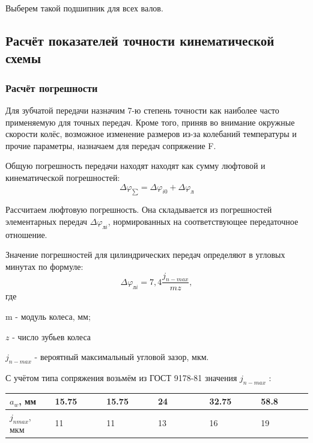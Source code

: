 \documentclass[14pt,a4paper,russian]{scrartcl}
\begin{document}
        Выберем такой подшипник для всех валов.

    
\subsection{Расчёт показателей точности кинематической схемы}
    \subsubsection{Расчёт погрешности}
        Для зубчатой передачи назначим 7-ю степень точности как 
        наиболее часто применяемую для точных передач. Кроме того, приняв во 
        внимание окружные скорости колёс, возможное изменение размеров
        из-за колебаний температуры и прочие параметры, назначаем
        для передач сопряжение F.\par

        Общую погрешность передачи находят находят как сумму люфтовой и
        кинематической погрешностей:
        \[ \Delta\varphi_{\sum} = \Delta\varphi_{i0}  + \Delta\varphi_{\text{л}}\]
        
        Рассчитаем люфтовую погрешность. Она складывается из погрешностей
        элементарных передач \( \Delta\varphi_{\text{л}i} \), нормированных
        на соответствующее передаточное отношение. \par 

        Значение погрешностей для цилиндрических передач определяют в
         угловых минутах по формуле:
         \[ \Delta\varphi_{\text{л}i} = 7,4\frac{j_{n-max}}{mz}, \]
         где\par \qquad m - модуль колеса, мм;\par
            \qquad\( z \) - число зубьев колеса\par
            \qquad\( j_{n-max} \) - вероятный максимальный угловой зазор, мкм.\par
        
        С учётом типа сопряжения возьмём из ГОСТ 9178-81 значения \( j_{n-max} \)   :
        \begin{table}[h!]
            \begin{center}
                \begin{tabular}{p{0.15\linewidth}|p{0.17\linewidth}p{0.17\linewidth}p{0.17\linewidth}p{0.17\linewidth}p{0.17\linewidth}}
                    \hline
                    \( a_w \), мм & 15.75 & 15.75 & 24 & 32.75 & 58.8 \\
                    \hline
                    \( j_{n max} \), мкм & 11 & 11 & 13 & 16 & 19 \\
                    \hline
                \end{tabular}
            \end{center}
        \end{table}
\end{document}
